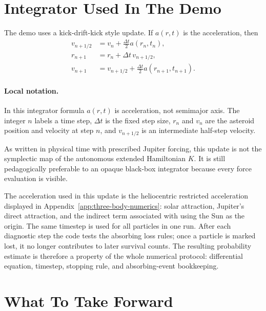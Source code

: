 \section{Integrator Used In The Demo}
\label{sec:asteroid-integrator}

The demo uses a kick-drift-kick style update. If \(a(r,t)\) is the acceleration,
then
\[
\begin{aligned}
  v_{n+1/2} &= v_n+\frac{\Delta t}{2}a(r_n,t_n),\\
  r_{n+1} &= r_n+\Delta t\,v_{n+1/2},\\
  v_{n+1} &= v_{n+1/2}+\frac{\Delta t}{2}a(r_{n+1},t_{n+1}).
\end{aligned}
\]

\paragraph{Local notation.}
In this integrator formula \(a(r,t)\) is acceleration, not semimajor axis.
The integer \(n\) labels a time step, \(\Delta t\) is the fixed step size,
\(r_n\) and \(v_n\) are the asteroid position and velocity at step \(n\), and
\(v_{n+1/2}\) is an intermediate half-step velocity.

As written in physical time with prescribed Jupiter forcing, this update is not
the symplectic map of the autonomous extended Hamiltonian \(K\). It is still
pedagogically preferable to an opaque black-box integrator because every force
evaluation is visible.

The acceleration used in this update is the heliocentric restricted
acceleration displayed in Appendix~\ref{app:three-body-numerics}: solar
attraction, Jupiter's direct attraction, and the indirect term associated with
using the Sun as the origin.  The same timestep is used for all particles in one
run.  After each diagnostic step the code tests the absorbing loss rules; once a
particle is marked lost, it no longer contributes to later survival counts.  The
resulting probability estimate is therefore a property of the whole numerical
protocol: differential equation, timestep, stopping rule, and absorbing-event
bookkeeping.

\section{What To Take Forward}
\label{sec:three-body-take-forward}

